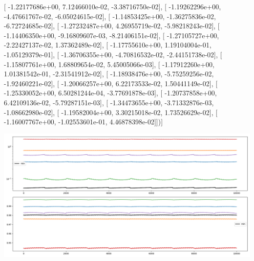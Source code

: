 \documentclass{article}
\begin{document}
       [ -1.22177686e+00,   7.12466010e-02,  -3.38716750e-02],
       [ -1.19262296e+00,  -4.47661767e-02,  -6.05024615e-02],
       [ -1.14853425e+00,  -1.36275836e-02,  -6.72724685e-02],
       [ -1.27232487e+00,   4.26955719e-02,  -5.98218243e-02],
       [ -1.14406350e+00,  -9.16809607e-03,  -8.21406151e-02],
       [ -1.27105727e+00,  -2.22427137e-02,   1.37362489e-02],
       [ -1.17755610e+00,   1.19104004e-01,  -1.05129379e-01],
       [ -1.36706355e+00,  -4.70816532e-02,  -2.44151738e-02],
       [ -1.15807761e+00,   1.68809654e-02,   5.45005066e-03],
       [ -1.17912260e+00,   1.01381542e-01,  -2.31541912e-02],
       [ -1.18938476e+00,  -5.75259256e-02,  -1.92460221e-02],
       [ -1.20066257e+00,   6.22173533e-02,   1.50441149e-02],
       [ -1.25330052e+00,   6.50281244e-04,  -3.77691878e-03],
       [ -1.20737858e+00,   6.42109136e-02,  -5.79287151e-03],
       [ -1.34473655e+00,  -3.71332876e-03,  -1.08662980e-02],
       [ -1.19582004e+00,   3.30215018e-02,   1.73526629e-02],
       [ -1.16007767e+00,  -1.02553601e-01,   4.46878398e-02]])]
\begin{center}
\includegraphics[scale=.9]{control_dpn_all.png}

\end{center}
\end{document}
